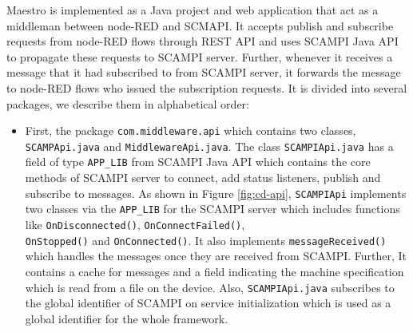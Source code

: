 Maestro is implemented as a Java project and web application that act as a middleman between node-RED and SCMAPI. It accepts publish and subscribe requests from node-RED flows through REST API and uses  SCAMPI Java API to propagate these requests to SCAMPI server. Further, whenever it receives a message that it had subscribed to from SCAMPI server, it forwards the message to  node-RED flows who issued the subscription requests. It is divided into several packages, we describe them in alphabetical order:
 \begin{itemize}
 
  \item First, the package \verb|com.middleware.api| which contains two classes, \verb|SCAMPApi.java|  and \verb|MiddlewareApi.java|. The class \verb|SCAMPIApi.java| has a field of type \verb|APP_LIB| from SCAMPI Java API which contains the core methods of SCAMPI server to connect, add status listeners, publish and subscribe to messages.  As shown in Figure \ref{fig:cd-api}, \verb|SCAMPIApi| implements two classes via the \verb|APP_LIB| for the SCAMPI server which includes functions like \verb|OnDisconnected()|, \verb|OnConnectFailed()|,\\  \verb|OnStopped()| and  \verb|OnConnected()|. It also implements \verb|messageReceived()| which handles the messages once they are received from SCAMPI. Further, It contains a cache for messages and a field indicating the machine specification which is read from a file on the device. Also, \verb|SCAMPIApi.java| subscribes to the global identifier of SCAMPI on service initialization which is used as a global identifier for the whole framework. 
 

\end{itemize}
